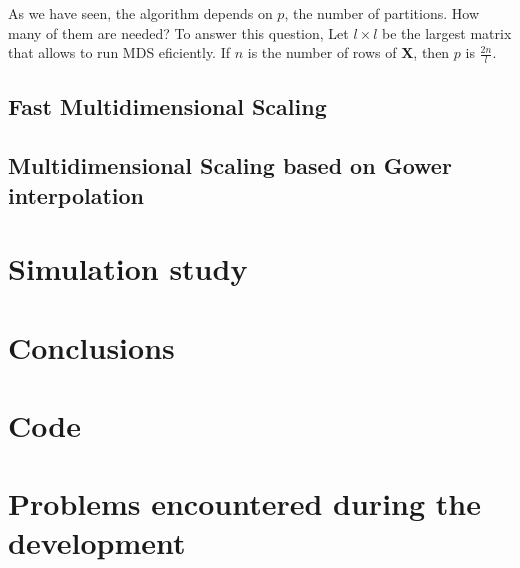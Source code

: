 \documentclass[11pt]{report}
\begin{document}
As we have seen, the algorithm depends on $p$, the number of partitions. How 
many of them are needed? To answer this question, Let $l \times l$ be the largest 
matrix that allows to run MDS eficiently. If $n$ is the number of rows 
of \textbf{X}, then $p$ is $\frac{2n}{l}$. 

\section{Fast Multidimensional Scaling}




\section{Multidimensional Scaling based on Gower interpolation}



\chapter{Simulation study}

\chapter{Conclusions}

%




\appendix 

\chapter{Code}
\label{chap:code}

\chapter{Problems encountered during the development}
\end{document}
